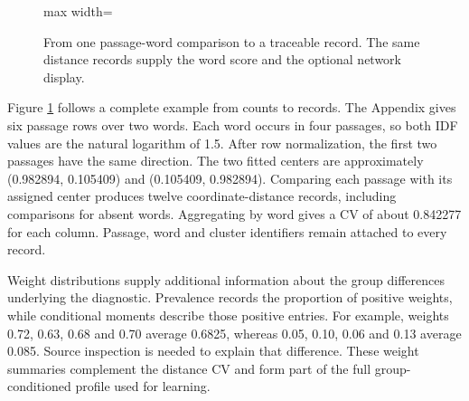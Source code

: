 \documentclass[10pt,letterpaper]{article}
\begin{document}
\begin{figure}[H]
\begin{adjustbox}{max width=\linewidth}
%
\endgroup%

\end{adjustbox}
\caption{From one passage-word comparison to a traceable record. The same distance records supply the word score and the optional network display.}
\label{fig:longformat}
\end{figure}
\FloatBarrier
Figure \ref{fig:longformat} follows a complete example from counts to records. The Appendix gives six passage rows over two words. Each word occurs in four passages, so both IDF values are the natural logarithm of 1.5. After row normalization, the first two passages have the same direction. The two fitted centers are approximately (0.982894, 0.105409) and (0.105409, 0.982894). Comparing each passage with its assigned center produces twelve coordinate-distance records, including comparisons for absent words. Aggregating by word gives a CV of about 0.842277 for each column. Passage, word and cluster identifiers remain attached to every record.\par

Weight distributions supply additional information about the group differences underlying the diagnostic. Prevalence records the proportion of positive weights, while conditional moments describe those positive entries. For example, weights 0.72, 0.63, 0.68 and 0.70 average 0.6825, whereas 0.05, 0.10, 0.06 and 0.13 average 0.085. Source inspection is needed to explain that difference. These weight summaries complement the distance CV and form part of the full group-conditioned profile used for learning.\par
\end{document}
